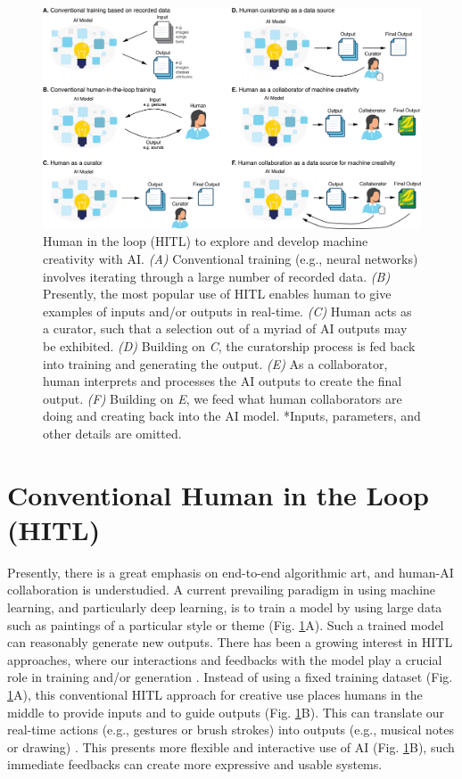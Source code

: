 \documentclass[letterpaper]{article} %
\begin{document}
\begin{figure}[tbh!]
\begin{center}
\includegraphics[width=1\textwidth]{hitl_creativity2.png}
\end{center}
\caption{Human in the loop (HITL) to explore and develop machine creativity with AI. \emph{(A)} Conventional training (e.g., neural networks) involves iterating through a large number of recorded data. \emph{(B)} Presently, the most popular use of HITL enables human to give examples of inputs and/or outputs in real-time. \emph{(C)} Human acts as a curator, such that a selection out of a myriad of AI outputs may be exhibited. \emph{(D)} Building on \emph{C}, the curatorship process is fed back into training and generating the output. \emph{(E)} As a collaborator, human interprets and processes the AI outputs to create the final output. \emph{(F)} Building on \emph{E}, we feed what human collaborators are doing and creating back into the AI model. *Inputs, parameters, and other details are omitted.}
\label{hitl}
\end{figure}

\section{Conventional Human in the Loop (HITL)}

Presently, there is a great emphasis on end-to-end algorithmic art, and human-AI collaboration is understudied. A current prevailing paradigm in using machine learning, and particularly deep learning, is to train a model by using large data such as paintings of a particular style or theme (Fig. \ref{hitl}A). Such a trained model can reasonably generate new outputs. There has been a growing interest in HITL approaches, where our interactions and feedbacks with the model play a crucial role in training and/or generation \cite{HITLML}. Instead of using a fixed training dataset (Fig. \ref{hitl}A), this conventional HITL approach for creative use places humans in the middle to provide inputs and to guide outputs (Fig. \ref{hitl}B). This can translate our real-time actions (e.g., gestures or brush strokes) into outputs (e.g., musical notes or drawing) \cite{Fiebrink2009}. This presents more flexible and interactive use of AI (Fig. \ref{hitl}B), such immediate feedbacks can create more expressive and usable systems.
\end{document}
